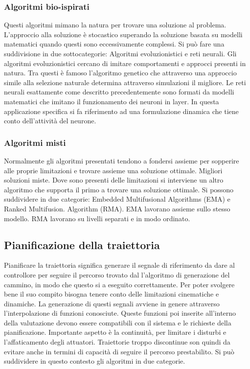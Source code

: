 \subsubsection{Algoritmi bio-ispirati}
Questi algoritmi mimano la natura per trovare una soluzione al problema. L'approccio alla soluzione è stocastico superando la soluzione basata su modelli matematici quando questi sono eccessivamente complessi.
Si può fare una suddivisione in due sottocategorie: Algoritmi evoluzionistici e reti neurali.
Gli algoritmi evoluzionistici cercano di imitare comportamenti e approcci presenti in natura. Tra questi è famoso l'algoritmo genetico che attraverso una approccio simile alla selezione naturale determina attraverso simulazioni il migliore.
Le reti neurali esattamente come descritto precedentemente sono formati da modelli matematici che imitano il funzionamento dei neuroni in layer. In questa applicazione specifica si fa riferimento ad una formulazione dinamica che tiene conto dell'attività del neurone.

\subsubsection{Algoritmi misti}
Normalmente gli algoritmi presentati tendono a fondersi assieme per sopperire alle proprie limitazioni e trovare assieme una soluzione ottimale. Migliori soluzioni miste. Dove sono presenti delle limitazioni si interviene un altro algoritmo che supporta il primo a trovare una soluzione ottimale.	Si possono suddividere in due categorie: Embedded Multifusional Algorithms (EMA) e Ranked Multifusion. Algorithm (RMA).
EMA lavorano assieme sullo stesso modello.
RMA lavorano su livelli separati e in modo ordinato.


\subsection{Pianificazione della traiettoria}
Pianificare la traiettoria significa generare il segnale di riferimento da dare al controllore per seguire il percorso trovato dal l'algoritmo di generazione del cammino, in modo che questo si a eseguito correttamente. Per poter svolgere bene il suo compito bisogna tenere conto delle limitazioni cinematiche e dinamiche. La generazione di questi segnali avviene in genere attraverso l'interpolazione di funzioni conosciute. Queste funzioni poi inserite all'interno della valutazione devono essere compatibili con il sistema e le richieste della pianificazione. Importante aspetto è la continuità, per limitare i disturbi e l'affaticamento degli attuatori. Traiettorie troppo discontinue son quindi da evitare anche in termini di capacità di seguire il percorso prestabilito.
Si può suddividere in questo contesto gli algoritmi in due categorie.
